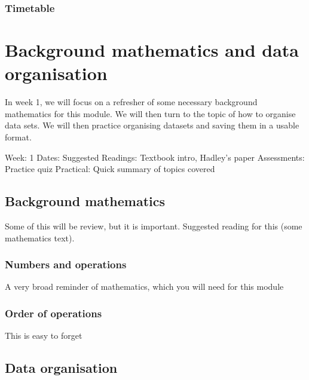 \documentclass[
]{book}
\begin{document}
\hypertarget{timetable}{%
\section{Timetable}\label{timetable}}

\hypertarget{part-background-mathematics-and-data-organisation}{%
\part{Background mathematics and data organisation}\label{part-background-mathematics-and-data-organisation}}

In week 1, we will focus on a refresher of some necessary background mathematics for this module. We will then turn to the topic of how to organise data sets. We will then practice organising datasets and saving them in a usable format.

Week: 1
Dates:
Suggested Readings: Textbook intro, Hadley's paper
Assessments: Practice quiz
Practical: Quick summary of topics covered

\hypertarget{background_mathematics}{%
\chapter{Background mathematics}\label{background_mathematics}}

Some of this will be review, but it is important. Suggested reading for this (some mathematics text).

\hypertarget{numbers-and-operations}{%
\section{Numbers and operations}\label{numbers-and-operations}}

A very broad reminder of mathematics, which you will need for this module

\hypertarget{order-of-operations}{%
\section{Order of operations}\label{order-of-operations}}

This is easy to forget

\hypertarget{data_organisation}{%
\chapter{Data organisation}\label{data_organisation}}
\end{document}
